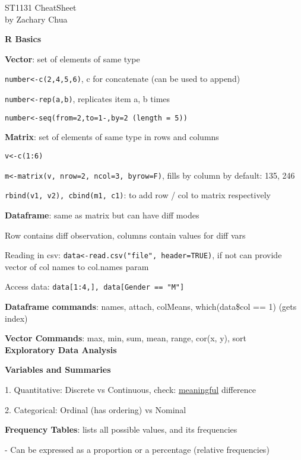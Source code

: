 \documentclass[10pt, a4paper]{article}
\author{Zachary Chua Yan Ern}
\date{May 2022}
\newcommand{\header}[1]{{\normalsize\textbf{#1}}}
\newcommand{\tab}[0]{\hspace*{2mm}}
\begin{document}
	\scriptsize %
	\setlength\parindent{0pt}
	\setlength{\columnseprule}{0.1pt}
	
	\begin{center}
		{\large ST1131 CheatSheet}\\
		by Zachary Chua
	\end{center}

	\begin{multicols*}{3}
		\header{R Basics}
		
		\textbf{Vector}: set of elements of same type

		\texttt{number<-c(2,4,5,6)}, c for concatenate (can be used to append)

		\texttt{number<-rep(a,b)}, replicates item a, b times

		\texttt{number<-seq(from=2,to=1-,by=2 (length = 5))}

		\textbf{Matrix}: set of elements of same type in rows and columns

		\texttt{v<-c(1:6)}

		\texttt{m<-matrix(v, nrow=2, ncol=3, byrow=F)}, fills by column by default: 135, 246

		\texttt{rbind(v1, v2), cbind(m1, c1)}: to add row / col to matrix respectively

		\textbf{Dataframe}: same as matrix but can have diff modes

		Row contains diff observation, columns contain values for diff vars

		Reading in csv: \texttt{data<-read.csv("file", header=TRUE)}, if not can provide vector of col names 
		to col.names param

		Access data: \texttt{data[1:4,], data[Gender == "M"]}

		\textbf{Dataframe commands}: names, attach, colMeans, which(data\$col == 1) (gets index)

		\textbf{Vector Commands}: max, min, sum, mean, range, cor(x, y), sort\\

		\header{Exploratory Data Analysis}

		\textbf{Variables and Summaries}

		1. Quantitative: Discrete vs Continuous, check: \underline{meaningful} difference

		2. Categorical: Ordinal (has ordering) vs Nominal

		\textbf{Frequency Tables}: lists all possible values, and its frequencies

		\tab{} - Can be expressed as a proportion or a percentage (relative frequencies)


\end{multicols*}
\end{document}
